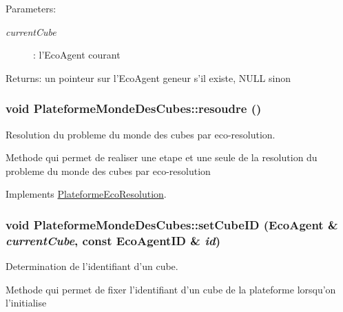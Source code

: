 \begin{Desc}
\item[Parameters:]
\begin{description}
\item[{\em currentCube}]: l'EcoAgent courant \end{description}
\end{Desc}
\begin{Desc}
\item[Returns:]un pointeur sur l'EcoAgent geneur s'il existe, NULL sinon \end{Desc}
\hypertarget{classPlateformeMondeDesCubes_c7be18c8d02e2743e884545828cfabed}{
\subsubsection[{resoudre}]{\setlength{\rightskip}{0pt plus 5cm}void PlateformeMondeDesCubes::resoudre ()}}
\label{classPlateformeMondeDesCubes_c7be18c8d02e2743e884545828cfabed}


Resolution du probleme du monde des cubes par eco-resolution. 

Methode qui permet de realiser une etape et une seule de la resolution du probleme du monde des cubes par eco-resolution 

Implements \hyperlink{classPlateformeEcoResolution_17f587580cd8aee537551bc0ddd82bef}{PlateformeEcoResolution}.\hypertarget{classPlateformeMondeDesCubes_c99c6db4dfc2b193d8697103bec3d4d4}{
\subsubsection[{setCubeID}]{\setlength{\rightskip}{0pt plus 5cm}void PlateformeMondeDesCubes::setCubeID ({\bf EcoAgent} \& {\em currentCube}, \/  const {\bf EcoAgentID} \& {\em id})}}
\label{classPlateformeMondeDesCubes_c99c6db4dfc2b193d8697103bec3d4d4}


Determination de l'identifiant d'un cube. 

Methode qui permet de fixer l'identifiant d'un cube de la plateforme lorsqu'on l'initialise

